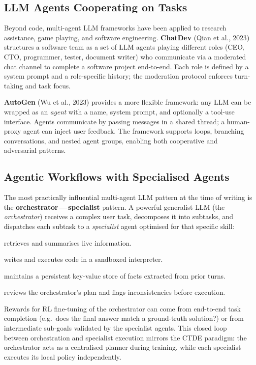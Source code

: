 \subsection{LLM Agents Cooperating on Tasks}

Beyond code, multi-agent LLM frameworks have been applied to research
assistance, game playing, and software engineering. \textbf{ChatDev}
(Qian et al., 2023) structures a software team as a set of LLM agents
playing different roles (CEO, CTO, programmer, tester, document writer)
who communicate via a moderated chat channel to complete a software
project end-to-end. Each role is defined by a system prompt and
a role-specific history; the moderation protocol enforces turn-taking
and task focus.

\textbf{AutoGen} (Wu et al., 2023) provides a more
flexible framework: any LLM can be wrapped as an \emph{agent} with a
name, system prompt, and optionally a tool-use interface. Agents
communicate by passing messages in a shared thread; a human-proxy
agent can inject user feedback. The framework supports loops, branching
conversations, and nested agent groups, enabling both cooperative and
adversarial patterns.

\subsection{Agentic Workflows with Specialised Agents}

The most practically influential multi-agent LLM pattern at the time
of writing is the \textbf{orchestrator\,---\,specialist} pattern.
A powerful generalist LLM (the \emph{orchestrator}) receives a complex
user task, decomposes it into subtasks, and dispatches each subtask to
a \emph{specialist} agent optimised for that specific skill:
\begin{description}[leftmargin=!, labelwidth=3.5cm]
  \item[Web search agent] retrieves and summarises live information.
  \item[Code agent] writes and executes code in a sandboxed
    interpreter.
  \item[Memory agent] maintains a persistent key-value store of facts
    extracted from prior turns.
  \item[Critic agent] reviews the orchestrator's plan and flags
    inconsistencies before execution.
\end{description}
Rewards for RL fine-tuning of the orchestrator can come from
end-to-end task completion (e.g.\ does the final answer match a
ground-truth solution?) or from intermediate sub-goals validated by
the specialist agents. This closed loop between orchestration and
specialist execution mirrors the CTDE paradigm: the orchestrator
acts as a centralised planner during training, while each specialist
executes its local policy independently.


